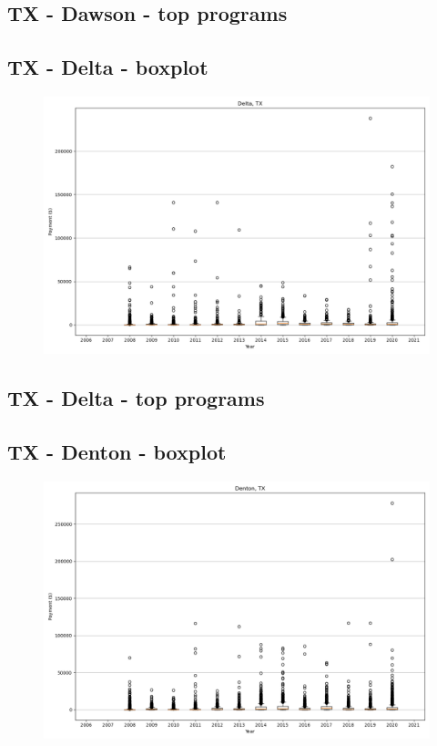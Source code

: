 \subsection*{TX - Dawson - top programs}

\newpage
\subsection*{TX - Delta - boxplot}
\begin{figure}[h]
\centering
\includegraphics[width=7in]{../output/boxplots/counties/Delta-TX_boxplot.png}
\end{figure}


\subsection*{TX - Delta - top programs}

\newpage
\subsection*{TX - Denton - boxplot}
\begin{figure}[h]
\centering
\includegraphics[width=7in]{../output/boxplots/counties/Denton-TX_boxplot.png}
\end{figure}


